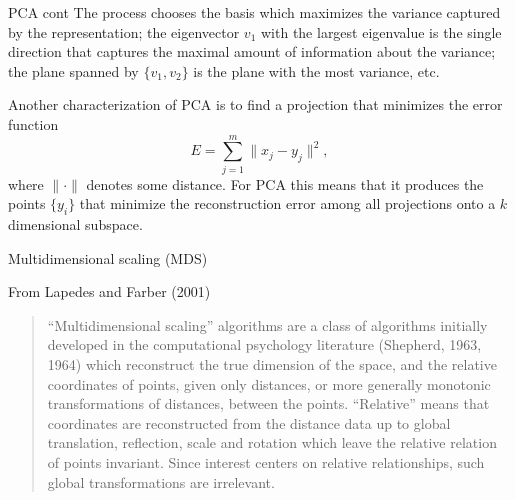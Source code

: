 \documentclass{beamer}
\begin{document}
\begin{frame}{PCA cont}
	The process chooses the basis which maximizes the variance captured by the representation; the eigenvector $v_1$ with the largest eigenvalue is the single direction that captures the maximal amount of information about the variance; the plane spanned by $\{v_1,v_2\}$ is the plane with the most variance, etc.
	
	Another characterization of PCA is to find a projection that minimizes the error function
	\begin{equation*}
		E= \sum_{j=1}^m \| x_j -y_j \|^2, 
	\end{equation*}
	where $\| \cdot \|$ denotes some distance. For PCA this means that it produces the points $\{y_i\}$ that minimize the reconstruction error among all projections onto a $k$ dimensional subspace. 
\end{frame}

\begin{frame}{Multidimensional scaling (MDS)}
	
From Lapedes and Farber (2001)
\begin{quote}
	``Multidimensional scaling'' algorithms are a class of algorithms
	initially developed in the computational psychology literature (Shepherd, 1963, 1964) which reconstruct the true dimension of the space, and the
	relative coordinates of points, given only distances, or more generally monotonic transformations of distances, between the points. ``Relative''
	means that coordinates are reconstructed from
	the distance data up to global translation, reflection, scale and rotation which leave the relative
	relation of points invariant. Since interest centers
	on relative relationships, such global transformations are irrelevant.
\end{quote}
	
\end{frame}
\end{document}
